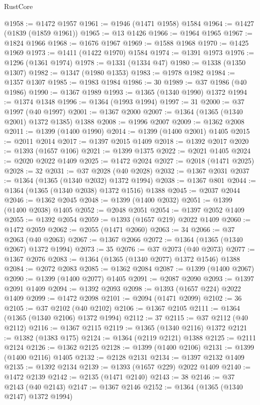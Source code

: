 \begin{lexlean}{RustCore}
\begin{coremodule}
@1958 := @1472 @1957
@1961 := @1946 (@1471 @1958) @1584
@1964 := @1427 (@1839 (@1859 @1961))
@1965 := @13 @1426
@1966 := @1964 @1965
@1967 := @1824 @1966
@1968 := @1676 @1967
@1969 := @1588 @1968
@1970 := @1425 @1969
@1973 := @1411 (@1422 @1970) @1584
@1974 := @1391 @1973
@1976 := @1296 (@1361 @1974)
@1978 := @1331 (@1334 @47)
@1980 := @1338 (@1350 @1307)
@1982 := @1347 (@1980 @1353)
@1983 := @1978 @1982
@1984 := @1357 @1307
@1985 := @1983 @1984
@1986 := 30
@1989 := @37 @1986 (@40 @1986)
@1990 := @1367 @1989
@1993 := @1365 (@1340 @1990) @1372
@1994 := @1374 @1348
@1996 := @1364 (@1993 @1994)
@1997 := 31
@2000 := @37 @1997 (@40 @1997)
@2001 := @1367 @2000
@2007 := @1364 (@1365 (@1340 @2001) @1372 @1385) @1388
@2008 := @1996 @2007
@2009 := @1362 @2008
@2011 := @1399 (@1400 @1990)
@2014 := @1399 (@1400 @2001) @1405
@2015 := @2011 @2014
@2017 := @1397 @2015 @1409
@2018 := @1392 @2017
@2020 := @1393 (@1657 @106)
@2021 := @1399 @1375
@2022 := @2021 @1405
@2024 := @2020 @2022 @1409
@2025 := @1472 @2024
@2027 := @2018 (@1471 @2025)
@2028 := 32
@2031 := @37 @2028 (@40 @2028)
@2032 := @1367 @2031
@2037 := @1364 (@1365 (@1340 @2032) @1372 @1994)
@2038 := @1367 @801
@2044 := @1364 (@1365 (@1340 @2038) @1372 @1516) @1388
@2045 := @2037 @2044
@2046 := @1362 @2045
@2048 := @1399 (@1400 @2032)
@2051 := @1399 (@1400 @2038) @1405
@2052 := @2048 @2051
@2054 := @1397 @2052 @1409
@2055 := @1392 @2054
@2059 := @1393 (@1657 @219) @2022 @1409
@2060 := @1472 @2059
@2062 := @2055 (@1471 @2060)
@2063 := 34
@2066 := @37 @2063 (@40 @2063)
@2067 := @1367 @2066
@2072 := @1364 (@1365 (@1340 @2067) @1372 @1994)
@2073 := 35
@2076 := @37 @2073 (@40 @2073)
@2077 := @1367 @2076
@2083 := @1364 (@1365 (@1340 @2077) @1372 @1546) @1388
@2084 := @2072 @2083
@2085 := @1362 @2084
@2087 := @1399 (@1400 @2067)
@2090 := @1399 (@1400 @2077) @1405
@2091 := @2087 @2090
@2093 := @1397 @2091 @1409
@2094 := @1392 @2093
@2098 := @1393 (@1657 @224) @2022 @1409
@2099 := @1472 @2098
@2101 := @2094 (@1471 @2099)
@2102 := 36
@2105 := @37 @2102 (@40 @2102)
@2106 := @1367 @2105
@2111 := @1364 (@1365 (@1340 @2106) @1372 @1994)
@2112 := 37
@2115 := @37 @2112 (@40 @2112)
@2116 := @1367 @2115
@2119 := @1365 (@1340 @2116) @1372
@2121 := @1382 (@1383 @175)
@2124 := @1364 (@2119 @2121) @1388
@2125 := @2111 @2124
@2126 := @1362 @2125
@2128 := @1399 (@1400 @2106)
@2131 := @1399 (@1400 @2116) @1405
@2132 := @2128 @2131
@2134 := @1397 @2132 @1409
@2135 := @1392 @2134
@2139 := @1393 (@1657 @229) @2022 @1409
@2140 := @1472 @2139
@2142 := @2135 (@1471 @2140)
@2143 := 38
@2146 := @37 @2143 (@40 @2143)
@2147 := @1367 @2146
@2152 := @1364 (@1365 (@1340 @2147) @1372 @1994)

\end{coremodule}
\end{lexlean}
